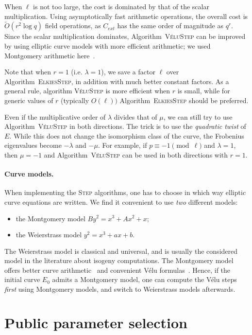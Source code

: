 \documentclass{llncs}
\newcommand{\softO}{\tilde{O}}
\newcommand{\algstyle}[1]{\textsc{#1}}
\begin{document}
When $\ell$ is not too large, the cost is dominated by that of the scalar
multiplication. Using asymptotically fast arithmetic operations,
the overall cost is $\softO(r^2\log q)$ field operations, as $C_{ext}$
has the same order of magnitude as $q^r$. Since the scalar
multiplication dominates, Algorithm~\algstyle{VéluStep} can be improved
by using elliptic curve models with more efficient arithmetic;
we used Montgomery arithmetic here~\cite{Montgomery87,CostelloSmith2017}.

Note that when $r = 1$
(i.e. $\lambda = 1$), we save a factor $\ell$ over Algorithm~\algstyle{ElkiesStep},
in addition with much better constant factors. As a general rule,
algorithm \algstyle{VéluStep} is more efficient when $r$ is small, while
for generic values of $r$ (typically $O(\ell))$ Algorithm~\algstyle{ElkiesStep}
should be preferred.

Even if the multiplicative order of $\lambda$ divides that of $\mu$,
we can still try to use Algorithm~\algstyle{VéluStep} in both directions.
The trick is to use the \emph{quadratic twist} of $E$. While this does not
change the isomorphism class of the curve, the Frobenius eigenvalues
become $-\lambda$ and $-\mu$. For example, if
$p \equiv -1\pmod{\ell}$ and $\lambda = 1$, then $\mu=-1$ and 
Algorithm~\algstyle{VéluStep} can be used in both directions with $r=1$.

\paragraph{Curve models.} When implementing the \algstyle{Step} algorithms,
one has to choose in which way elliptic curve equations are written.
We find it convenient to use \emph{two} different models:
\begin{itemize}
\item the Montgomery model $By^2 = x^3 + A x^2 + x$;
\item the Weierstrass model $y^2 = x^3 + ax + b$.
\end{itemize}
The Weierstrass model is classical and universal, 
and is usually the considered model in the literature
about isogeny computations.
The Montgomery model offers better curve
arithmetic~\cite{Montgomery87,CostelloSmith2017} 
and convenient Vélu formulas~\cite{Renes2018}.
Hence, if the initial curve $E_0$ admits a Montgomery model, one can
compute the Vélu steps \emph{first} using Montgomery models,
and switch to Weierstrass models afterwards.

\section{Public parameter selection}
\label{sec:initcurve}
\end{document}

